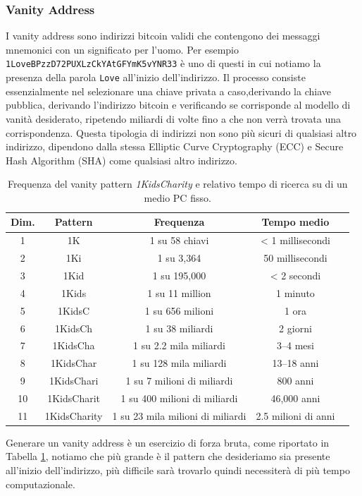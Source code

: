 \subsubsection{Vanity Address}
I vanity address sono indirizzi bitcoin validi che contengono dei messaggi mnemonici con un significato per l'uomo. Per esempio \texttt{1LoveBPzzD72PUXLzCkYAtGFYmK5vYNR33} è uno di questi in cui notiamo la presenza della parola \texttt{Love} all'inizio dell'indirizzo. Il processo consiste essenzialmente nel selezionare una chiave privata a caso,derivando la chiave pubblica, derivando l’indirizzo bitcoin e verificando se corrisponde al modello di vanità desiderato, ripetendo miliardi di volte fino a che non verrà trovata una corrispondenza. Questa tipologia di indirizzi non sono più sicuri di qualsiasi altro indirizzo, dipendono dalla stessa Elliptic Curve Cryptography (ECC) e Secure Hash Algorithm (SHA) come qualsiasi altro indirizzo.
\begin{table}[]
	\centering
	\begin{tabular}{|c|c|c|c|c|}
		\hline
		\textbf{Dim.} 	& \textbf{Pattern} 	& \textbf{Frequenza} 		& \textbf{Tempo medio} \\ \hline
		1 			& 1K 		& 1 su 58 chiavi 	& < 1 millisecondi \\ \hline
		2 			& 1Ki 		& 1 su 3,364 		& 50 millisecondi \\ \hline
		3 			& 1Kid 		& 1 su 195,000 		& < 2 secondi \\ \hline
		4 			& 1Kids 	& 1 su 11 million 	& 1 minuto \\ \hline
		5 			& 1KidsC 	& 1 su 656 milioni 	& 1 ora \\ \hline
		6 			& 1KidsCh 	& 1 su 38 miliardi 	& 2 giorni \\ \hline
		7 			& 1KidsCha 	& 1 su 2.2 mila miliardi 	& 3–4 mesi \\ \hline
		8 			& 1KidsChar & 1 su 128 mila miliardi 	& 13–18 anni \\ \hline
		9 			& 1KidsChari 	& 1 su 7 milioni di miliardi	& 800 anni \\ \hline
		10 			& 1KidsCharit 	& 1 su 400 milioni di miliardi	& 46,000 anni \\ \hline
		11 			& 1KidsCharity 	& 1 su 23 mila milioni di miliardi	& 2.5 milioni di anni \\ \hline
	\end{tabular}
	\caption{Frequenza del vanity pattern \textit{1KidsCharity} e relativo tempo di ricerca su di un medio PC fisso.}
	\label{tab:vanity-address-table}
\end{table}
Generare un vanity address è un esercizio di forza bruta, come riportato in Tabella \ref{tab:vanity-address-table}, notiamo che più grande è il pattern che desideriamo sia presente all'inizio dell'indirizzo, più difficile sarà trovarlo quindi necessiterà di più tempo computazionale. 

